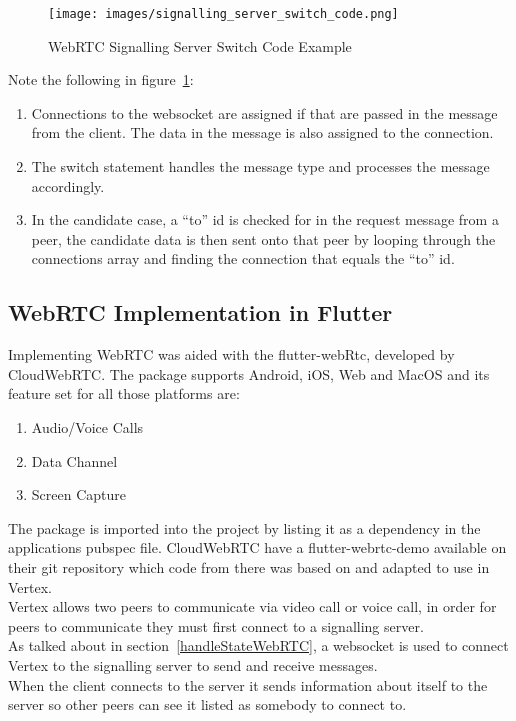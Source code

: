 \begin{figure}[h!]
    \caption{WebRTC Signalling Server  Switch Code Example}
    \label{image:webRTCSigServSwitchCode}
    \centering
    \texttt{[image: images/signalling\_server\_switch\_code.png]}
\end{figure}

Note the following in figure~\ref{image:webRTCSigServSwitchCode}:
\begin{enumerate}
    \item Connections to the websocket are assigned if that are passed in the message from the client. The data in the message is also assigned to the connection.
    \item The switch statement handles the message type and processes the message accordingly.
    \item In the candidate case, a “to” id is checked for in the request message from a peer, the candidate data is then sent onto that peer by looping through the connections array and finding the connection that equals the “to” id.
\end{enumerate}

\subsection{WebRTC Implementation in Flutter}
Implementing WebRTC was aided with the flutter-webRtc\cite{FlutterWebRTC}, developed by CloudWebRTC\cite{cloudWeb}. The package supports Android, iOS, Web and MacOS and its feature set for all those platforms are:
\begin{enumerate}
    \item Audio/Voice Calls
    \item Data Channel
    \item Screen Capture
\end{enumerate}
The package is imported into the project by listing it as a dependency in the applications pubspec file. CloudWebRTC have a flutter-webrtc-demo available on their git repository\cite{webrtc-demo} which code from there was based on and adapted to use in Vertex.
\\ Vertex allows two peers to communicate via video call or voice call, in order for peers to communicate they must first connect to a signalling server. 
\\ As talked about in section~\ref{handleStateWebRTC}, a websocket is used to connect Vertex to the signalling server to send and receive messages. 
\\ When the client connects to the server it sends information about itself to the server so other peers can see it listed as somebody to connect to. 

